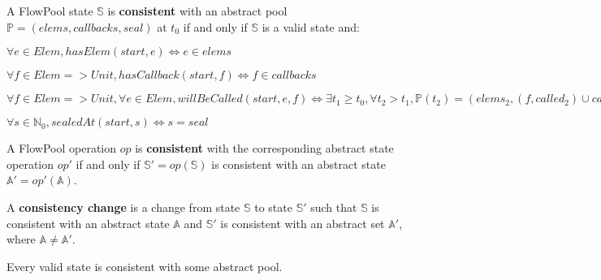 \begin{definitiontwo}[Consistency]
A FlowPool state $\mathbb{S}$ is \textbf{consistent} with an abstract pool
$\mathbb{P} = (elems, callbacks, seal)$ at $t_0$ if and only if $\mathbb{S}$
is a valid state and:
\begin{description}
\item $\forall e \in Elem, hasElem(start, e) \Leftrightarrow e \in elems$
\item $\forall f \in Elem => Unit, hasCallback(start, f) \Leftrightarrow f \in callbacks$
\item $\forall f \in Elem => Unit, \forall e \in Elem, willBeCalled(start, e, f) \Leftrightarrow \exists t_1 \geq t_0, \forall t_2 > t_1, \mathbb{P}(t_2) = (elems_2, (f, called_2) \cup callbacks_2, seal_2), elems \subseteq called_2$
\item $\forall s \in \mathbb{N}_0, sealedAt(start, s) \Leftrightarrow s = seal$
\end{description}

A FlowPool operation $op$ is \textbf{consistent} with the corresponding
abstract state operation $op'$ if and only if $\mathbb{S'}=op(\mathbb{S})$ is consistent
with an abstract state $\mathbb{A'}=op'(\mathbb{A})$.

A \textbf{consistency change}
is a change from state $\mathbb{S}$ to state $\mathbb{S'}$ such that $\mathbb{S}$
is consistent with an abstract state $\mathbb{A}$ and $\mathbb{S'}$ is consistent
with an abstract set $\mathbb{A'}$, where $\mathbb{A} \neq \mathbb{A'}$.

\end{definitiontwo}


\begin{proptwo}
Every valid state is consistent with some abstract pool.
\end{proptwo}

